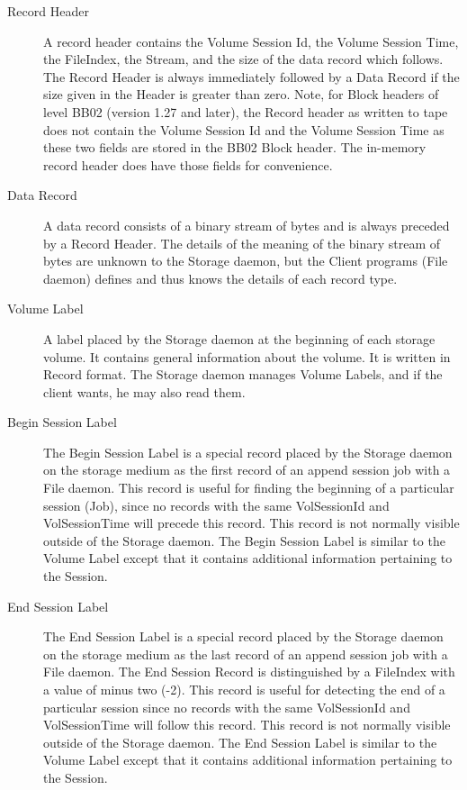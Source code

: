 \begin{description}
\item [Record Header]
   A record header contains the Volume Session Id, the  Volume Session Time, the
FileIndex, the Stream, and the size of the  data record which follows. The
Record Header is always immediately  followed by a Data Record if the size
given in the Header is greater  than zero. Note, for Block headers of level
BB02 (version 1.27  and later), the Record header as written to tape does not
contain  the Volume Session Id and the Volume Session Time as these two 
fields are stored in the BB02 Block header. The in-memory record  header does
have those fields for convenience. 

\item [Data Record]
   A data record consists of a binary stream of bytes  and is always preceded by
a Record Header. The details of the  meaning of the binary stream of bytes are
unknown to the Storage  daemon, but the Client programs (File daemon) defines
and thus  knows the details of each record type.  

\item [Volume Label]
   A label placed by the Storage daemon at the beginning  of each storage volume.
It contains general information about  the volume. It is written in Record
format. The Storage daemon  manages Volume Labels, and if the client wants, he
may also  read them.  

\item [Begin Session Label]
   The Begin Session Label is a special record  placed by the Storage daemon on
the storage medium as the first  record of an append session job with a File
daemon. This record  is useful for finding the beginning of a particular
session (Job),  since no records with the same VolSessionId and VolSessionTime
will precede this record. This record is not normally visible  outside of the
Storage daemon. The Begin Session Label is similar  to the Volume Label except
that it contains additional information  pertaining to the Session.  

\item [End Session Label]
   The End Session Label is a special record  placed by the Storage daemon on the
storage medium as the last  record of an append session job with a File
daemon. The End  Session Record is distinguished by a FileIndex with a value
of  minus two (-2). This record is useful for detecting the end of a 
particular session since no records with the same VolSessionId and 
VolSessionTime will follow this record. This record is not normally  visible
outside of the Storage daemon. The End Session Label is  similar to the Volume
Label except that it contains additional  information pertaining to the
Session. 
\end{description}

